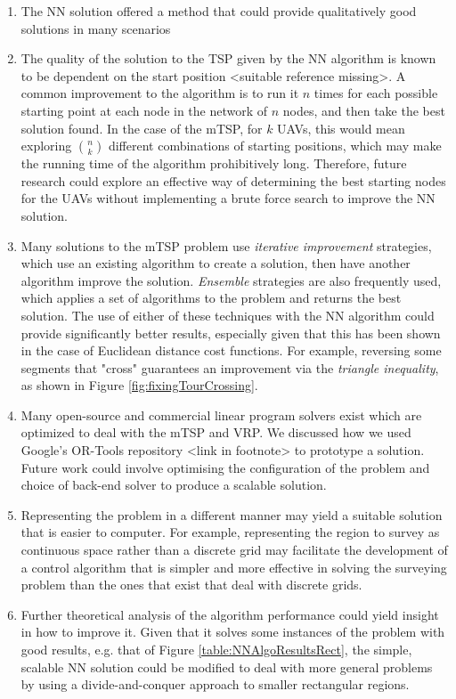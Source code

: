 \begin{enumerate}
    \item The NN solution offered a method that could provide qualitatively good solutions in many scenarios 
    
    \item The quality of the solution to the TSP given by the NN algorithm is known to be dependent on the start position <suitable reference missing>. A common improvement to the algorithm is to run it $n$ times for each possible starting point at each node in the network of $n$ nodes, and then take the best solution found. In the case of the mTSP, for $k$ UAVs, this would mean exploring ${n \choose k}$ different combinations of starting positions, which may make the running time of the algorithm prohibitively long. Therefore, future research could explore an effective way of determining the best starting nodes for the UAVs without implementing a brute force search to improve the NN solution.
    \item Many solutions to the mTSP problem use \textit{iterative improvement} strategies,  which use an existing algorithm to create a solution, then have another algorithm improve the solution.\textit{ Ensemble} strategies are also frequently used, which applies a set of algorithms to the  problem and returns the best solution. The use of either of these techniques with the NN algorithm could provide significantly better results, especially given that this has been shown in the case of Euclidean distance cost functions. For example, reversing some segments that "cross" guarantees an improvement via the \textit{triangle inequality}, as shown in Figure \ref{fig:fixingTourCrossing}. 
    \item Many open-source and commercial linear program solvers exist which are optimized to deal with the mTSP and VRP. We discussed how we used Google's OR-Tools repository <link in footnote> to prototype a solution. Future work could involve optimising the configuration of the problem and choice of back-end solver to produce a scalable solution.
    \item Representing the problem in a different manner may yield a suitable solution that is easier to computer. For example, representing the region to survey as continuous space rather than a discrete grid may facilitate the development of a control algorithm that is simpler and more effective in solving the surveying problem than the ones that exist that deal with discrete grids.
    \item Further theoretical analysis of the algorithm performance could yield insight in how to improve it. Given that it solves some instances of the problem with good results, e.g. that of Figure \ref{table:NNAlgoResultsRect}, the simple, scalable NN solution could be modified to deal with more general problems by using a divide-and-conquer approach to smaller rectangular regions.

\end{enumerate}
